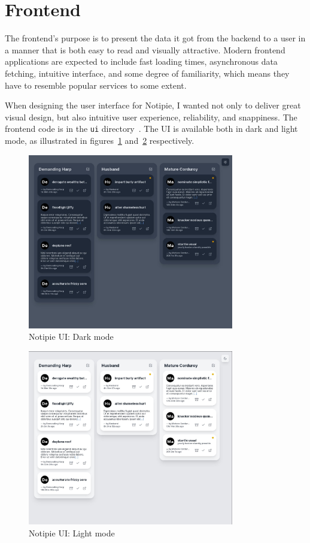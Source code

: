 \section{Frontend}\label{sec:frontend}

The frontend's purpose is to present the data
it got from the backend to a user
in a manner that is both easy to read
and visually attractive.
Modern frontend applications
are expected to include
fast loading times,
asynchronous data fetching,
intuitive interface,
and some degree of familiarity,
which means they have to resemble
popular services to some extent.

When designing the user interface for Notipie,
I wanted not only to deliver great visual design,
but also intuitive user experience,
reliability,
and snappiness.
The frontend code
is in the
\texttt{ui} directory~\cite{sewera_notipie_2022-5}.
The UI is available both in dark and light mode,
as illustrated in figures~\ref{fig:notipie-ui-dark}
and~\ref{fig:notipie-ui-light} respectively.

\begin{figure}[h]
  \centering
  \includegraphics[width=9cm,keepaspectratio]{img/notipie_dark.jpg}
  \caption{Notipie UI: Dark mode}
  \label{fig:notipie-ui-dark}
\end{figure}

\begin{figure}[h]
  \centering
  \includegraphics[width=9cm,keepaspectratio]{img/notipie_light.jpg}
  \caption{Notipie UI: Light mode}
  \label{fig:notipie-ui-light}
\end{figure}







